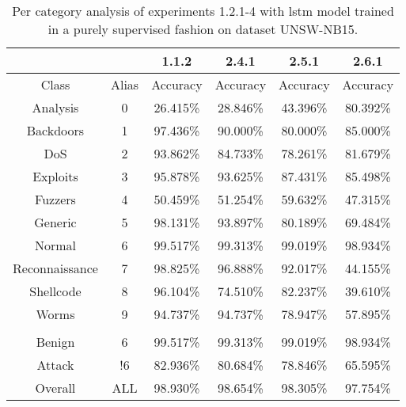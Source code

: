 \begin{table}[htb]
    \centering
    \begin{tabular}{@{}cccccc@{}}
        \toprule
         &  & 1.1.2 & 2.4.1 & 2.5.1 & 2.6.1 \\
        \midrule
        Class &  Alias &  Accuracy &  Accuracy &  Accuracy &  Accuracy \\
        Analysis &  0 &  26.415\% &  28.846\% &  43.396\% &  80.392\% \\
        Backdoors &  1 &  97.436\% &  90.000\% &  80.000\% &  85.000\% \\
        DoS &  2 &  93.862\% &  84.733\% &  78.261\% &  81.679\% \\
        Exploits &  3 &  95.878\% &  93.625\% &  87.431\% &  85.498\% \\
        Fuzzers &  4 &  50.459\% &  51.254\% &  59.632\% &  47.315\% \\
        Generic &  5 &  98.131\% &  93.897\% &  80.189\% &  69.484\% \\
        Normal &  6 &  99.517\% &  99.313\% &  99.019\% &  98.934\% \\
        Reconnaissance &  7 &  98.825\% &  96.888\% &  92.017\% &  44.155\% \\
        Shellcode &  8 &  96.104\% &  74.510\% &  82.237\% &  39.610\% \\
        Worms &  9 &  94.737\% &  94.737\% &  78.947\% &  57.895\% \\
         \\
        Benign &  6 &  99.517\% &  99.313\% &  99.019\% &  98.934\% \\
        Attack &  !6 &  82.936\% &  80.684\% &  78.846\% &  65.595\% \\
        Overall &  ALL &  98.930\% &  98.654\% &  98.305\% &  97.754\% \\
        \bottomrule
    \end{tabular}
    \caption{Per category analysis of experiments 1.2.1-4 with \gls{lstm} model trained in a purely supervised fashion on dataset UNSW-NB15.}
    \label{table:results:lstm:class_flows15_supervised}
\end{table}